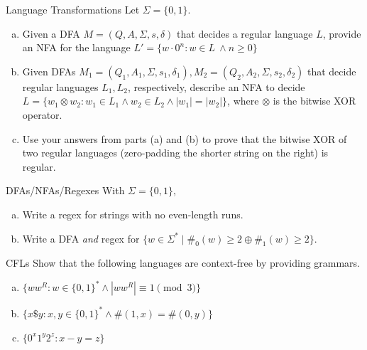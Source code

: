 \documentclass{beamer}
\begin{document}
\begin{frame}[t]{Language Transformations}
    Let $\Sigma = \{0,1\}$.
    \begin{enumerate}[(a)]
        \item Given a DFA $M = (Q, A, \Sigma, s, \delta)$ that decides a regular language $L$, provide an NFA for the language $L' = \{w \cdot 0^n: w \in L\> \wedge n \geq 0\}$
        \item \pause Given DFAs $M_1 = (Q_1, A_1, \Sigma, s_1, \delta_1), M_2 = (Q_2, A_2, \Sigma, s_2, \delta_2)$ that decide regular languages $L_1, L_2$, respectively, describe an NFA to decide $L = \{w_1 \otimes w_2: w_1 \in L_1 \wedge w_2 \in L_2 \wedge |w_1| = |w_2|\}$, where $\otimes$ is the bitwise XOR operator.
        \item \pause Use your answers from parts (a) and (b) to prove that the bitwise XOR of two regular languages (zero-padding the shorter string on the right) is regular.
    \end{enumerate}
\end{frame}

\begin{frame}[t]{DFAs/NFAs/Regexes}
    With $\Sigma = \{0,1\}$,
    \begin{enumerate}[(a)]
        \item Write a regex for strings with no even-length runs.
        
        \item \pause Write a DFA \textit{and} regex for $\{w \in \Sigma^* \mid \#_0(w) \ge 2 \oplus \#_1(w) \ge 2 \}$.
        
    \end{enumerate}
\end{frame}

\begin{frame}[t]{CFLs}
    Show that the following languages are context-free by providing grammars.
    \begin{enumerate}[(a)]
        \item  $\{ww^R: w \in \{0, 1\}^* \wedge |ww^R| \equiv 1 \pmod{3}\}$
        \item \pause $\{x\$y: x,y \in\{0,1\}^*\wedge \#(1,x) = \#(0,y)\}$
        \item \pause $\{0^x1^y2^z: x - y = z\}$
    \end{enumerate}
\end{frame}
\end{document}
